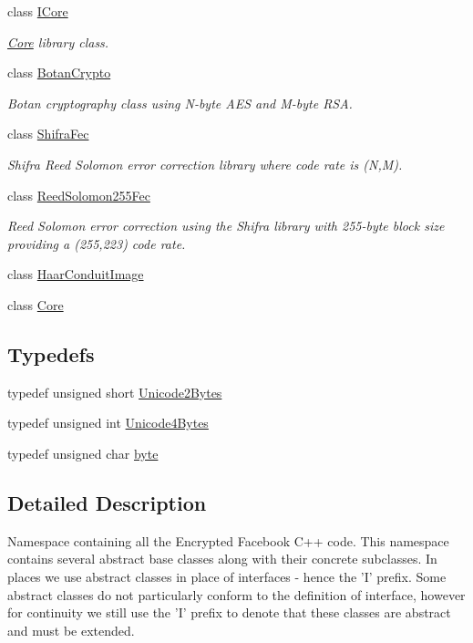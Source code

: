 \begin{DoxyCompactItemize}
class \hyperlink{classefb_1_1ICore}{ICore}
\begin{DoxyCompactList}\small\item\em \hyperlink{classefb_1_1Core}{Core} library class. \item\end{DoxyCompactList}\item 
class \hyperlink{classefb_1_1BotanCrypto}{BotanCrypto}
\begin{DoxyCompactList}\small\item\em Botan cryptography class using N-\/byte AES and M-\/byte RSA. \item\end{DoxyCompactList}\item 
class \hyperlink{classefb_1_1ShifraFec}{ShifraFec}
\begin{DoxyCompactList}\small\item\em Shifra Reed Solomon error correction library where code rate is (N,M). \item\end{DoxyCompactList}\item 
class \hyperlink{classefb_1_1ReedSolomon255Fec}{ReedSolomon255Fec}
\begin{DoxyCompactList}\small\item\em Reed Solomon error correction using the Shifra library with 255-\/byte block size providing a (255,223) code rate. \item\end{DoxyCompactList}\item 
class \hyperlink{classefb_1_1HaarConduitImage}{HaarConduitImage}
\item 
class \hyperlink{classefb_1_1Core}{Core}
\end{DoxyCompactItemize}
\subsection*{Typedefs}
\begin{DoxyCompactItemize}
\item 
typedef unsigned short \hyperlink{namespaceefb_acce95f2192212162af47fde5af397bea}{Unicode2Bytes}
\item 
typedef unsigned int \hyperlink{namespaceefb_aa0d3cfad43f6f1a2056b87427ada3b74}{Unicode4Bytes}
\item 
typedef unsigned char \hyperlink{namespaceefb_a0c8186d9b9b7880309c27230bbb5e69d}{byte}
\end{DoxyCompactItemize}


\subsection{Detailed Description}
Namespace containing all the Encrypted Facebook C++ code. This namespace contains several abstract base classes along with their concrete subclasses. In places we use abstract classes in place of interfaces -\/ hence the 'I' prefix. Some abstract classes do not particularly conform to the definition of interface, however for continuity we still use the 'I' prefix to denote that these classes are abstract and must be extended.

